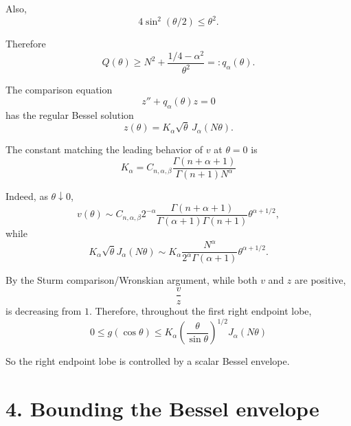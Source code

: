 \documentclass[11pt]{article}
\begin{document}
Also,
\begin{equation*}
4\sin^2(\theta/2)\le \theta^2.
\end{equation*}

Therefore
\begin{equation}
Q(\theta)
\ge
N^2+\frac{1/4-\alpha^2}{\theta^2}
=:q_\alpha(\theta).
\tag{11}
\end{equation}

The comparison equation
\begin{equation*}
z''+q_\alpha(\theta)z=0
\end{equation*}
has the regular Bessel solution
\begin{equation*}
z(\theta)=K_\alpha\sqrt{\theta}\,J_\alpha(N\theta).
\end{equation*}

The constant matching the leading behavior of \(v\) at \(\theta=0\) is
\begin{equation}
\boxed{
K_\alpha
=
C_{n,\alpha,\beta}
\frac{\Gamma(n+\alpha+1)}
{\Gamma(n+1)N^\alpha}
}
\tag{12}
\end{equation}

Indeed, as \(\theta\downarrow0\),
\begin{equation*}
v(\theta)
\sim
C_{n,\alpha,\beta}
2^{-\alpha}
\frac{\Gamma(n+\alpha+1)}
{\Gamma(\alpha+1)\Gamma(n+1)}
\theta^{\alpha+1/2},
\end{equation*}
while
\begin{equation*}
K_\alpha\sqrt{\theta}J_\alpha(N\theta)
\sim
K_\alpha
\frac{N^\alpha}{2^\alpha\Gamma(\alpha+1)}
\theta^{\alpha+1/2}.
\end{equation*}

By the Sturm comparison/Wronskian argument, while both \(v\) and \(z\) are positive,
\begin{equation*}
\frac{v}{z}
\end{equation*}
is decreasing from \(1\). Therefore, throughout the first right endpoint lobe,
\begin{equation}
\boxed{
0\le g(\cos\theta)
\le
K_\alpha
\left(\frac{\theta}{\sin\theta}\right)^{1/2}
J_\alpha(N\theta)
}
\tag{13}
\end{equation}

So the right endpoint lobe is controlled by a scalar Bessel envelope.

\section*{4. Bounding the Bessel envelope}
\end{document}
